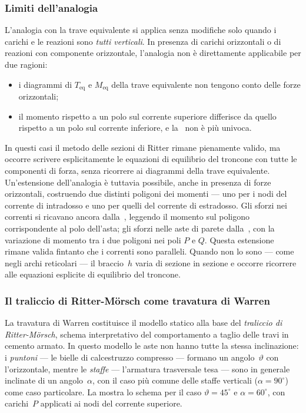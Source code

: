 \subsubsection{Limiti dell'analogia}
\label{subsec:limiti_analogia}

L'analogia con la trave equivalente si applica
senza modifiche solo quando i carichi e le reazioni
sono \emph{tutti verticali}. In presenza di carichi
orizzontali o di reazioni con componente orizzontale,
l'analogia non è direttamente applicabile per due
ragioni:

\begin{itemize}[noitemsep]
	\item i diagrammi di $T_\text{eq}$ e
	$M_\text{eq}$ della trave equivalente non
	tengono conto delle forze orizzontali;
	\item il momento rispetto a un polo sul corrente
	superiore differisce da quello rispetto a
	un polo sul corrente inferiore, e
	la~ non è più univoca.
\end{itemize}

In questi casi il metodo delle sezioni di Ritter
rimane pienamente valido, ma occorre scrivere
esplicitamente le equazioni di equilibrio del
troncone con tutte le componenti di forza, senza
ricorrere ai diagrammi della trave equivalente.
Un'estensione dell'analogia è tuttavia possibile,
anche in presenza di forze orizzontali, costruendo
due distinti poligoni dei momenti --- uno per i nodi
del corrente di intradosso e uno per quelli del
corrente di estradosso. Gli sforzi nei correnti
si ricavano ancora dalla~,
leggendo il momento sul poligono corrispondente
al polo dell'asta; gli sforzi nelle aste di parete
dalla~, con la variazione
di momento tra i due poligoni nei poli $P$ e $Q$.
Questa estensione rimane valida fintanto che i
correnti sono paralleli. Quando non lo sono ---
come negli archi reticolari --- il braccio~$h$
varia di sezione in sezione e occorre ricorrere
alle equazioni esplicite di equilibrio del troncone.

\subsubsection{Il traliccio di Ritter-M\"{o}rsch come travatura di Warren}

La travatura di Warren costituisce il modello statico
alla base del \emph{traliccio di Ritter-Mörsch},
schema interpretativo del comportamento a taglio delle
travi in cemento armato. In questo modello le aste non
hanno tutte la stessa inclinazione: i \emph{puntoni}
--- le bielle di calcestruzzo compresso --- formano un
angolo~$\vartheta$ con l'orizzontale, mentre le
\emph{staffe} --- l'armatura trasversale tesa ---
sono in generale inclinate di un angolo~$\alpha$,
con il caso più comune delle staffe verticali
($\alpha = 90^\circ$) come caso particolare.
La  mostra lo schema
per il caso $\vartheta = 45^\circ$ e $\alpha = 60^\circ$,
con carichi~$P$ applicati ai nodi del corrente superiore.

